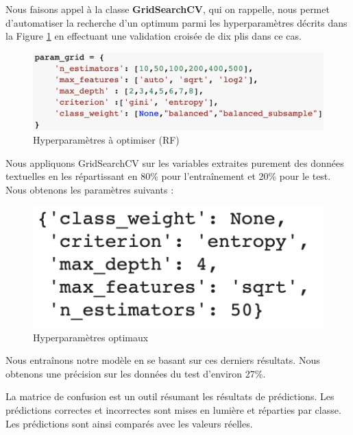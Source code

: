 \documentclass[11pt]{article}
\begin{document}
\begin{center}
Nous faisons appel à la classe \textbf{GridSearchCV}, qui on rappelle, nous permet d'automatiser la recherche d'un optimum parmi les hyperparamètres décrits dans la Figure \ref{paramtunRF} en effectuant une validation croisée de dix plis dans ce cas.\par

\begin{figure}[hbt!]
    \centering
    \includegraphics[width= 13 cm]{figures/paramtunRF.png}
    \caption{Hyperparamètres à optimiser (RF)}
    \label{paramtunRF}
\end{figure}
\FloatBarrier

Nous appliquons GridSearchCV sur les variables extraites purement des données textuelles en les répartissant en 80\% pour l’entraînement et 20\% pour le test. Nous obtenons les paramètres suivants :

\begin{figure}[hbt!]
    \centering
    \includegraphics[width = 7 cm]{./figures/outputCVRF.png}
    \caption{Hyperparamètres optimaux}
    \label{CV1}
\end{figure}
\FloatBarrier

Nous entraînons notre modèle en se basant sur ces derniers résultats. Nous obtenons une précision sur les données du test d'environ 27\%.

La matrice de confusion est un outil résumant les résultats de prédictions. Les prédictions correctes et incorrectes sont mises en lumière et réparties par classe. Les prédictions sont ainsi comparés avec les valeurs réelles.


\end{center}
\end{document}

